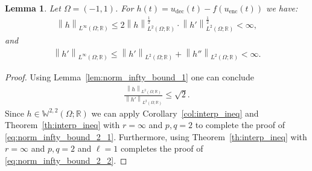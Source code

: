 \documentclass{article}
\newtheorem{lemma}{Lemma}
\def\encs{u_\textrm{enc}}
\def\decs{u_\textrm{dec}}
\newcommand\Abs[1]{\left\vert #1 \right \vert}
\newcommand{\norm}[1]{\left\lVert#1\right\rVert}
\newcommand{\lp}[1]{{L}^{#1}\left(\Omega; \mathbb{R}\right)}
\newcommand{\sob}[2]{\mathbb{W}^{#1,#2}\left(\Omega; \mathbb{R}\right)}
\newcommand{\lec}[2]{\stackrel{\text{#1}}{#2}}
\begin{document}
\begin{lemma}\label{lem:norm_infty_bound_2}
Let $\Omega=(-1,1)$. For $h(t) = \decs(t) - f(\encs(t))$ we have:
\begin{align}\label{eq:norm_infty_bound_2_1}
  \norm{h}_{\lp{\infty}} \leqslant 2\norm{h}^\frac{1}{2}_{\lp{2}}\cdot\norm{h'}^\frac{1}{2}_{\lp{2}} < \infty,
\end{align}
and
\begin{align}\label{eq:norm_infty_bound_2_2}
  \norm{h'}_{\lp{\infty}} \leqslant \norm{h'}_{\lp{2}} + \norm{h''}_{\lp{2}} < \infty.
\end{align}
\end{lemma}
\begin{proof}
    Using Lemma~\ref{lem:norm_infty_bound_1} one can conclude
    \begin{align}
        \frac{\norm{h}_{\lp{2}}}{\norm{h'}_{\lp{2}}} \leqslant \sqrt{2}.
    \end{align}
    Since $h \in \sob{2}{2}$ we can apply Corollary~\ref{col:interp_ineq} and Theorem~\ref{th:interp_ineq} with $r=\infty$ and $p,q=2$ to complete the proof of \eqref{eq:norm_infty_bound_2_1}. Furthermore, using Theorem~\ref{th:interp_ineq} with $r=\infty$ and $p,q=2$ and $\ell = 1$ completes the proof of \eqref{eq:norm_infty_bound_2_2}.
\end{proof}
\end{document}
